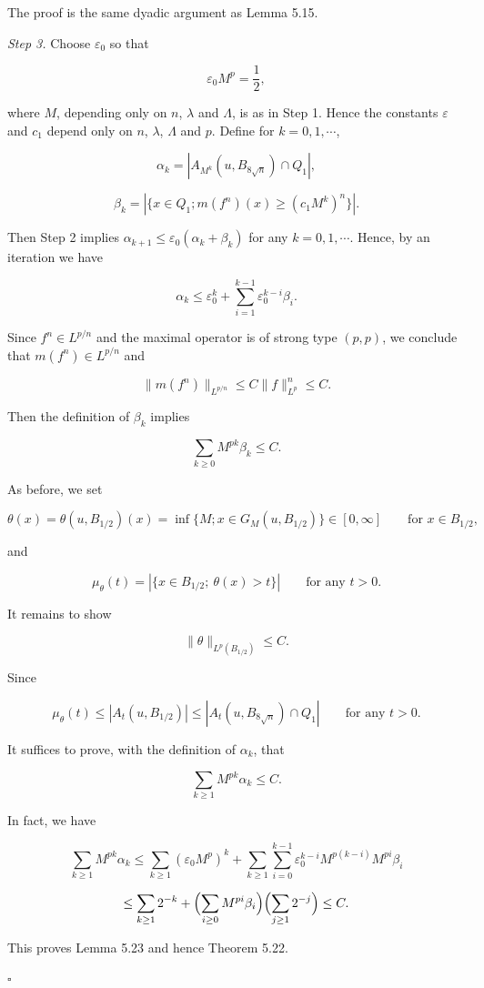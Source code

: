 The proof is the same dyadic argument as Lemma 5.15.

\textit{Step 3.} Choose $\varepsilon_0$ so that

\[
\varepsilon_0M^p=\frac12,
\]

where $M$, depending only on $n$, $\lambda$ and $\Lambda$, is as in Step 1. Hence the constants $\varepsilon$ and
$c_1$ depend only on $n$, $\lambda$, $\Lambda$ and $p$. Define for $k=0,1,\cdots$,

\[
\alpha_k=|A_{M^k}(u,B_{8\sqrt n})\cap Q_1|,
\]

\[
\beta_k=|\{x\in Q_1;m(f^n)(x)\ge (c_1M^k)^n\}|.
\]

Then Step 2 implies $\alpha_{k+1}\le \varepsilon_0(\alpha_k+\beta_k)$ for any $k=0,1,\cdots$. Hence, by an iteration
we have

\[
\alpha_k\le \varepsilon_0^k+\sum_{i=1}^{k-1}\varepsilon_0^{k-i}\beta_i.
\]

Since $f^n\in L^{p/n}$ and the maximal operator is of strong type $(p,p)$, we conclude
that $m(f^n)\in L^{p/n}$ and

\[
\|m(f^n)\|_{L^{p/n}}\le C\|f\|_{L^p}^n\le C.
\]

Then the definition of $\beta_k$ implies

\[
\sum_{k\ge 0}M^{pk}\beta_k\le C.
\]

As before, we set

\[
\theta(x)=\theta(u,B_{1/2})(x)=\inf\{M;x\in G_M(u,B_{1/2})\}\in[0,\infty]\qquad \text{for }x\in B_{1/2},
\]

and

\[
\mu_\theta(t)=|\{x\in B_{1/2};\ \theta(x)>t\}|\qquad \text{for any }t>0.
\]

It remains to show

\[
\|\theta\|_{L^p(B_{1/2})}\le C.
\]

Since

\[
\mu_\theta(t)\le |A_t(u,B_{1/2})|\le |A_t(u,B_{8\sqrt n})\cap Q_1|\qquad \text{for any }t>0.
\]

It suffices to prove, with the definition of $\alpha_k$, that

\[
\sum_{k\ge 1}M^{pk}\alpha_k\le C.
\]

In fact, we have

\[
\sum_{k\ge 1}M^{pk}\alpha_k\le \sum_{k\ge 1}(\varepsilon_0M^p)^k+\sum_{k\ge 1}\sum_{i=0}^{k-1}\varepsilon_0^{k-i}M^{p(k-i)}M^{pi}\beta_i
\]

\[
\le \sum_{k\ge 1}2^{-k}+\Bigl(\sum_{i\ge 0}M^{pi}\beta_i\Bigr)\Bigl(\sum_{j\ge 1}2^{-j}\Bigr)\le C.
\]

This proves Lemma 5.23 and hence Theorem 5.22.

\hfill$\square$
